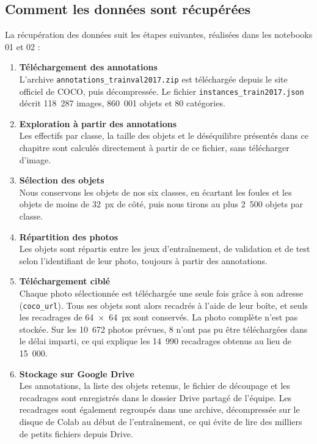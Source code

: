 \subsection{Comment les données sont récupérées}

La récupération des données suit les étapes suivantes, réalisées dans les notebooks 01 et 02 :

\begin{enumerate}
  \item \textbf{Téléchargement des annotations}\\
  L'archive \texttt{annotations\_trainval2017.zip} est téléchargée depuis le site officiel de COCO, puis décompressée. Le fichier \texttt{instances\_train2017.json} décrit 118~287 images, 860~001 objets et 80 catégories.
  \item \textbf{Exploration à partir des annotations}\\
  Les effectifs par classe, la taille des objets et le déséquilibre présentés dans ce chapitre sont calculés directement à partir de ce fichier, sans télécharger d'image.
  \item \textbf{Sélection des objets}\\
  Nous conservons les objets de nos six classes, en écartant les foules et les objets de moins de 32~px de côté, puis nous tirons au plus 2~500 objets par classe.
  \item \textbf{Répartition des photos}\\
  Les objets sont répartis entre les jeux d'entraînement, de validation et de test selon l'identifiant de leur photo, toujours à partir des annotations.
  \item \textbf{Téléchargement ciblé}\\
  Chaque photo sélectionnée est téléchargée une seule fois grâce à son adresse (\texttt{coco\_url}). Tous ses objets sont alors recadrés à l'aide de leur boîte, et seuls les recadrages de 64~×~64~px sont conservés. La photo complète n'est pas stockée. Sur les 10~672 photos prévues, 8 n'ont pas pu être téléchargées dans le délai imparti, ce qui explique les 14~990 recadrages obtenus au lieu de 15~000.
  \item \textbf{Stockage sur Google Drive}\\
  Les annotations, la liste des objets retenus, le fichier de découpage et les recadrages sont enregistrés dans le dossier Drive partagé de l'équipe. Les recadrages sont également regroupés dans une archive, décompressée sur le disque de Colab au début de l'entraînement, ce qui évite de lire des milliers de petits fichiers depuis Drive.
\end{enumerate}

